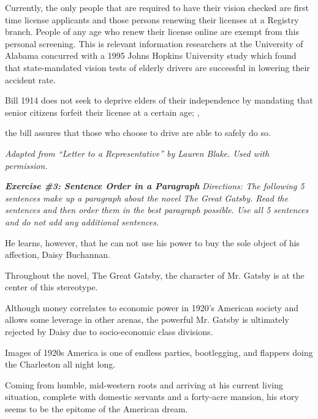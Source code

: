 \documentclass[12pt]{book}
\renewcommand{\indent}{\hspace{1cm}}
\newcommand{\longline}{\underline{\hspace{2in}} }
\begin{document}
\begin{spacing}{2}
\begin{linenumbers*}
\indent Currently, the only people that are required to have their vision checked are first time license applicants and those persons renewing their licenses at a Registry branch. People of any age who renew their license online are exempt from this personal screening. This is relevant information \longline researchers at the University of Alabama concurred with a 1995 Johns Hopkins University study which found that state-mandated vision tests of elderly drivers are successful in lowering their accident rate.

\indent \longline Bill 1914 does not seek to deprive elders of their independence by mandating that senior citizens forfeit their license at a certain age; \hrulefill,

the bill assures that those who choose to drive are able to safely do so.
\end{linenumbers*}

\textit{Adapted from “Letter to a Representative” by Lauren Blake. Used with permission. }
\end{spacing}

\bigskip
\textbf{\textit{Exercise \#3: Sentence Order in a Paragraph}}
\bigskip
\textit{Directions: The following 5 sentences make up a paragraph about the novel The Great Gatsby. Read the sentences and then order them in the best paragraph possible. Use all 5 sentences and do not add any additional sentences. }

\bigskip
\underline{\hspace{0.5in}}He learns, however, that he can not use his power to buy the sole object of his affection, Daisy Buchannan. 

\bigskip
\underline{\hspace{0.5in}}Throughout the novel, The Great Gatsby, the character of Mr. Gatsby is at the center of this stereotype. 

\bigskip
\underline{\hspace{0.5in}}Although money correlates to economic power in 1920's American society and allows some leverage in other arenas, the powerful Mr. Gatsby is ultimately rejected by Daisy due to socio-economic class divisions.

\bigskip
\underline{\hspace{0.5in}}Images of 1920s America is one of endless parties, bootlegging, and flappers doing the Charleston all night long. 

\bigskip
\underline{\hspace{0.5in}} Coming from humble, mid-western roots and arriving at his current living situation, complete with domestic servants and a forty-acre mansion, his story seems to be the epitome of the American dream.
\end{document}
